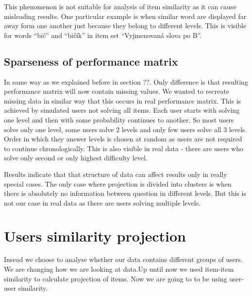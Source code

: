\documentclass[
  digital, %
  table,   %
  nolof,     %
  nolot,     %
  nocover
]{fithesis3}
\begin{document}


This phenomenon is not suitable for analysis of item similarity as it
can cause misleading results. One particular example is when similar
word are displayed far away form one another just because they belong to
different levels. This is visible for words ``bič'' and ``bičík'' in
item set ``Vyjmenovaná slova po B''.

\subsection{Sparseness of performance
matrix}\label{sparseness-of-performance-matrix}



In same way as we explained before in section ??. Only difference is that resulting performance matrix will now contain missing values. We wanted to recreate missing data in similar way that this occurs in real performance matrix. This is achieved by simulated users not solving all items. Each user starts with solving one level and then with some probability continues to another. So most users solve only one level, some users solve 2 levels and only few users solve all 3 levels. Order in which they answer levels is chosen at random as users are not required to continue chronologically. This is also visible in real data - there are users who solve only second or only highest difficulty level.

Results indicate that that structure of data can affect results only in really special cases. The only case where projection is divided into clusters is when there is absolutely no information between question in different levels. But this is not our case in real data as there are users solving multiple levels.


\section{Users similarity
projection}\label{users-similarity-projection}

Insead we choose to analyse whether our data contains different groups
of users. We are changing how we are looking at data.Up until now we
used item-item similarity to calculate projection of items. Now we are
going to to be using user-user similarity.
\end{document}
